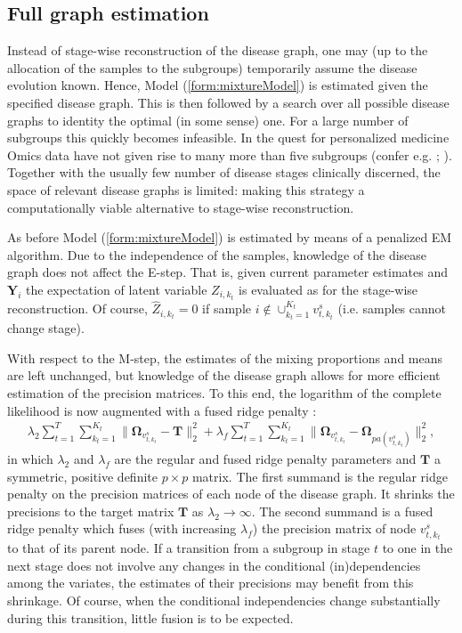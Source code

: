 \documentclass[10pt]{article}
\begin{document}
\subsection{Full graph estimation}
Instead of stage-wise reconstruction of the disease graph, one may (up to the allocation of the samples to the subgroups) temporarily assume the disease evolution known. Hence, Model (\ref{form:mixtureModel}) is estimated given the specified disease graph. This is then followed by a search over all possible disease graphs to identity the optimal (in some sense) one. For a large number of subgroups this quickly becomes infeasible. In the quest for personalized medicine Omics data have not given rise to many more than five subgroups (confer e.g. \citealp{Per2000}; \citealp{Sorl2001}). Together with the usually few number of disease stages clinically discerned, the space of relevant disease graphs is limited: making this strategy a computationally viable alternative to stage-wise reconstruction.

As before Model (\ref{form:mixtureModel}) is estimated by means of a penalized EM algorithm. Due to the independence of the samples, knowledge of the disease graph does not affect the E-step. That is, given current parameter estimates and $\mathbf{Y}_i$ the expectation of latent variable $Z_{i, k_t}$ is evaluated as for the stage-wise reconstruction. Of course, $\hat{Z}_{i, k_t} = 0$ if sample $i \not\in \cup_{k_t=1}^{K_t} v_{t, k_t}^s$ (i.e. samples cannot change stage).

With respect to the M-step, the estimates of the mixing proportions and means are left unchanged, but knowledge of the disease graph allows for more efficient estimation of the precision matrices. To this end, the logarithm of the complete likelihood is now augmented with a fused ridge penalty \citep{Bilg2015}:
\begin{eqnarray*}
\lambda_2 \sum_{t=1}^T\sum_{k_t=1}^{K_t} \| \mathbf{\Omega}_{v^s_{t, k_t}} - \mathbf{T} \|_2^2  + \lambda_f \sum_{t=1}^T \sum_{k_t=1}^{K_t} \| \mathbf{\Omega}_{v^s_{t, k_t}} - \mathbf{\Omega}_{pa(v^s_{t, k_t})} \|_2^2,
\end{eqnarray*}
in which $\lambda_2$ and $\lambda_f$ are the regular and fused ridge penalty parameters and $\mathbf{T}$ a symmetric, positive definite $p \times p$ matrix. The first summand is the regular ridge penalty on the precision matrices of each node of the disease graph. It shrinks the precisions to the target matrix $\mathbf{T}$ as $\lambda_2 \rightarrow \infty$. The second summand is a fused ridge penalty which fuses (with increasing $\lambda_f$) the precision matrix of node $v^s_{t, k_t}$ to that of its parent node. If a transition from a subgroup in stage $t$ to one in the next stage does not involve any changes in the conditional (in)dependencies among the variates, the estimates of their precisions may benefit from this shrinkage. Of course, when the conditional independencies change substantially during this transition, little fusion is to be expected.
\end{document}
